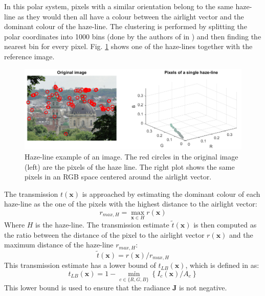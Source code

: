 \documentclass[conference]{IEEEtran}
\begin{document}
In this polar system, pixels with a similar orientation belong to the same haze-line as they would then all have a colour between the airlight vector and the dominant colour of the haze-line. The clustering is performed by splitting the polar coordinates into 1000 bins (done by the authors of \cite{dehaze} in \cite{github}) and then finding the nearest bin for every pixel. Fig. \ref{fig:haze_lines} shows one of the haze-lines together with the reference image. 
\begin{figure}
    \centering
    \includegraphics[width=\linewidth]{img/hazeLine.png}
    \caption{Haze-line example of an image. The red circles in the original image (left) are the pixels of the haze line. The right plot shows the same pixels in an RGB space centered around the airlight vector.}
    \label{fig:haze_lines}
\end{figure}
The transmission $t(\mathbf{x})$ is approached by estimating the dominant colour of each haze-line as the one of the pixels with the highest distance to the airlight vector:
\begin{equation}
    \label{eq:dominant_color}
    r_{max, H} = \max_{\mathbf{x} \in H} r(\mathbf{x})
\end{equation}
Where $H$ is the haze-line. The transmission estimate $\tilde{t}(\mathbf{x})$ is then computed as the ratio between the distance of the pixel to the airlight vector $r(\mathbf{x})$ and the maximum distance of the haze-line $r_{max, H}$:
\begin{equation}
    \label{eq:transmission_estimate}
    \tilde{t}(\mathbf{x}) = r(\mathbf{x})/r_{max, H}
\end{equation}
This transmission estimate has a lower bound of $t_{LB}(\mathbf{x})$, which is defined in \cite{dehaze} as:
\begin{equation}
    \label{eq:lower_bound_transmission}
    t_{LB}(\mathbf{x}) = 1 - \min_{c \in \{R, G, B\}} \left\{I_c(\mathbf{x}) / A_c\right\}
\end{equation}
This lower bound is used to ensure that the radiance $\mathbf{J}$ is not negative.\par
\end{document}
